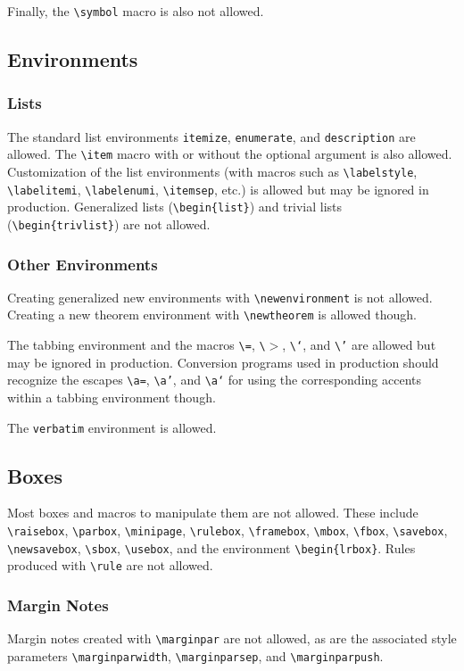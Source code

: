 \documentclass[twocolumn,secnumarabic,amssymb, nobibnotes, aps, prd]{revtex4-2}
\newcommand{\macro}[1]{\texttt{\textbackslash#1}}
\newcommand{\m}[1]{\macro{#1}}
\newcommand{\env}[1]{\texttt{#1}}
\begin{document}
Finally, the \m{symbol} macro is also not allowed.

\subsection{Environments}
\subsubsection{Lists}
The standard list environments \texttt{itemize}, \texttt{enumerate},
and \texttt{description} are allowed. The \m{item} macro with or without
the optional argument is also allowed. Customization of the list environments
(with macros such as \m{labelstyle}, \m{labelitemi}, \m{labelenumi},
\m{itemsep}, etc.) is allowed but may be ignored in production.
Generalized lists (\m{begin\{list\}}) and trivial lists
(\m{begin\{trivlist\}}) are not allowed.

\subsubsection{Other Environments}
Creating generalized new environments with \m{newenvironment} is not
allowed. Creating a new theorem environment with \m{newtheorem} is
allowed though.

The tabbing environment and the macros \m{=}, \m{$>$}, \m{`}, and
\m{'} are allowed but may be ignored in production. Conversion
programs used in production should recognize the escapes \m{a=},
\m{a'}, and \m{a`} for using the corresponding accents within a
tabbing environment though.

The \env{verbatim} environment is allowed.

\subsection{Boxes}
Most boxes and macros to manipulate them are not allowed. These
include \m{raisebox}, \m{parbox}, \m{minipage}, \m{rulebox},
\m{framebox}, \m{mbox}, \m{fbox}, \m{savebox}, \m{newsavebox},
\m{sbox}, \m{usebox}, and the environment \m{begin\{lrbox\}}. Rules
produced with \m{rule} are not allowed.

\subsubsection{Margin Notes}
Margin notes created with \m{marginpar} are not allowed, as are the
associated style parameters \m{marginparwidth}, \m{marginparsep}, and
\m{marginparpush}.
\end{document}

